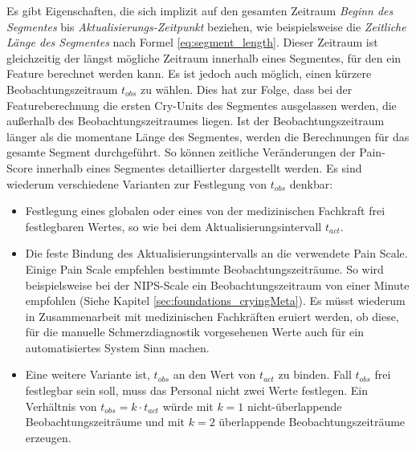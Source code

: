 Es gibt Eigenschaften, die sich implizit auf den gesamten Zeitraum \emph{Beginn des Segmentes} bis \emph{Aktualisierungs-Zeitpunkt} beziehen, wie beispielsweise die \emph{Zeitliche Länge des Segmentes} nach Formel \ref{eq:segment_length}. Dieser Zeitraum ist gleichzeitig der längst mögliche Zeitraum innerhalb eines Segmentes, für den ein Feature berechnet werden kann. Es ist jedoch auch möglich, einen kürzere Beobachtungszeitraum $t_{obs}$ zu wählen. Dies hat zur Folge, dass bei der Featureberechnung die ersten Cry-Units des Segmentes ausgelassen werden, die außerhalb des Beobachtungszeitraumes liegen. Ist der Beobachtungszeitraum länger als die momentane Länge des Segmentes, werden die Berechnungen für das gesamte Segment durchgeführt. So können zeitliche Veränderungen der Pain-Score innerhalb eines Segmentes detaillierter dargestellt werden. Es sind wiederum verschiedene Varianten zur Festlegung von $t_{obs}$ denkbar:
\begin{itemize}
\item Festlegung eines globalen oder eines von der medizinischen Fachkraft frei festlegbaren Wertes, so wie bei dem Aktualisierungsintervall $t_{act}$.
\item Die feste Bindung des Aktualisierungsintervalls an die verwendete Pain Scale. Einige Pain Scale empfehlen bestimmte Beobachtungszeiträume. So wird beispielsweise bei der NIPS-Scale ein Beobachtungszeitraum von einer Minute empfohlen (Siehe Kapitel \ref{sec:foundations_cryingMeta}). Es müsst wiederum in Zusammenarbeit mit medizinischen Fachkräften eruiert werden, ob diese, für die manuelle Schmerzdiagnostik vorgesehenen Werte auch für ein automatisiertes System Sinn machen.
\item Eine weitere Variante ist, $t_{obs}$ an den Wert von $t_{act}$ zu binden. Fall $t_{obs}$ frei festlegbar sein soll, muss das Personal nicht zwei Werte festlegen. Ein Verhältnis von $t_{obs} = k \cdot t_{act}$ würde mit $k=1$ nicht-überlappende Beobachtungszeiträume und  mit $k=2$ überlappende Beobachtungszeiträume erzeugen.
\end{itemize}